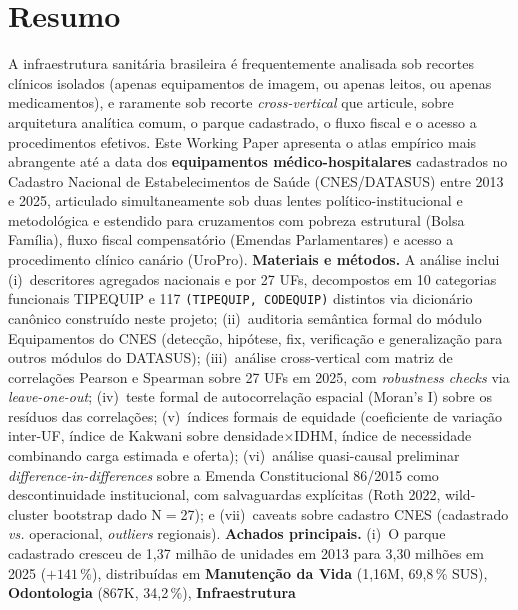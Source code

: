 \documentclass[12pt,a4paper,oneside]{article}
\begin{document}
\section*{Resumo}
\begin{singlespace}\small\noindent
A infraestrutura sanitária brasileira é frequentemente analisada
sob recortes clínicos isolados (apenas equipamentos de imagem, ou
apenas leitos, ou apenas medicamentos), e raramente sob recorte
\textit{cross-vertical} que articule, sobre arquitetura analítica
comum, o parque cadastrado, o fluxo fiscal e o acesso a
procedimentos efetivos. Este Working Paper apresenta o atlas
empírico mais abrangente até a data dos \textbf{equipamentos
médico-hospitalares} cadastrados no Cadastro Nacional de
Estabelecimentos de Saúde (CNES/DATASUS) entre 2013 e 2025,
articulado simultaneamente sob duas lentes \textemdash{}
político-institucional e metodológica \textemdash{} e estendido
para cruzamentos com pobreza estrutural (Bolsa Família),
fluxo fiscal compensatório (Emendas Parlamentares) e acesso a
procedimento clínico canário (UroPro). \textbf{Materiais e
métodos.} A análise inclui (i)~descritores agregados nacionais e por
27 UFs, decompostos em 10 categorias funcionais TIPEQUIP e
117 \texttt{(TIPEQUIP, CODEQUIP)} distintos via dicionário canônico
construído neste projeto;
(ii)~auditoria semântica formal do módulo Equipamentos do CNES
(detecção, hipótese, fix, verificação e generalização para outros
módulos do DATASUS);
(iii)~análise cross-vertical com matriz de correlações Pearson e
Spearman sobre 27 UFs em 2025, com \textit{robustness checks} via
\textit{leave-one-out};
(iv)~teste formal de autocorrelação espacial (Moran's I) sobre os
resíduos das correlações;
(v)~índices formais de equidade
(coeficiente de variação inter-UF, índice de Kakwani sobre
densidade$\times$IDHM, índice de necessidade combinando carga
estimada e oferta);
(vi)~análise quasi-causal preliminar
\textit{difference-in-differences} sobre a Emenda Constitucional
86/2015 como descontinuidade institucional, com salvaguardas
explícitas (Roth 2022, wild-cluster bootstrap dado N$=$27); e
(vii)~caveats sobre cadastro CNES (cadastrado \textit{vs.}
operacional, \textit{outliers} regionais).
\textbf{Achados principais.}
(i)~O parque cadastrado cresceu de 1,37 milhão de unidades em 2013
para 3,30 milhões em 2025 ($+141$\,\%), distribuídas em
\textbf{Manutenção da Vida} (1,16M, 69,8\,\% SUS),
\textbf{Odontologia} (867K, 34,2\,\%), \textbf{Infraestrutura}

\end{singlespace}
\end{document}
